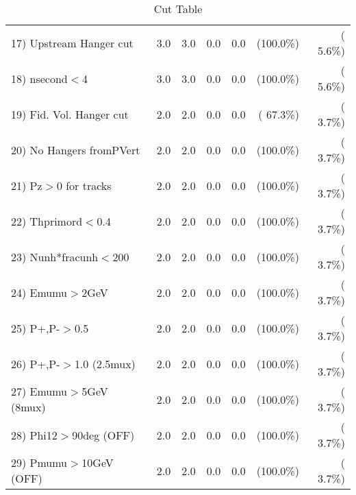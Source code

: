 \begin{table}[h!]
\begin{tabular}{||l||r|r|r|r|r|r||}
 17) Upstream Hanger cut  &          3.0 &          3.0 &          0.0 &          0.0 & (100.0\%) & (  5.6\%) \\
 18) nsecond$<$4          &          3.0 &          3.0 &          0.0 &          0.0 & (100.0\%) & (  5.6\%) \\
 19) Fid. Vol. Hanger cut &          2.0 &          2.0 &          0.0 &          0.0 & ( 67.3\%) & (  3.7\%) \\
 20) No Hangers fromPVert &          2.0 &          2.0 &          0.0 &          0.0 & (100.0\%) & (  3.7\%) \\
 21) Pz$>$0 for tracks    &          2.0 &          2.0 &          0.0 &          0.0 & (100.0\%) & (  3.7\%) \\
 22) Thprimord$<$0.4      &          2.0 &          2.0 &          0.0 &          0.0 & (100.0\%) & (  3.7\%) \\
 23) Nunh*fracunh$<$200   &          2.0 &          2.0 &          0.0 &          0.0 & (100.0\%) & (  3.7\%) \\
 24) Emumu$>$2GeV         &          2.0 &          2.0 &          0.0 &          0.0 & (100.0\%) & (  3.7\%) \\
 25) P+,P-$>$0.5          &          2.0 &          2.0 &          0.0 &          0.0 & (100.0\%) & (  3.7\%) \\
 26) P+,P-$>$1.0 (2.5mux) &          2.0 &          2.0 &          0.0 &          0.0 & (100.0\%) & (  3.7\%) \\
 27) Emumu$>$5GeV  (8mux) &          2.0 &          2.0 &          0.0 &          0.0 & (100.0\%) & (  3.7\%) \\
 28) Phi12$>$90deg  (OFF) &          2.0 &          2.0 &          0.0 &          0.0 & (100.0\%) & (  3.7\%) \\
 29) Pmumu$>$10GeV  (OFF) &          2.0 &          2.0 &          0.0 &          0.0 & (100.0\%) & (  3.7\%) \\
 \hline
 \hline
 \end{tabular}
 \caption{Cut Table           }
 \label{tab-cutcohjpsi-mumu_anuecc}
 \end{table}
